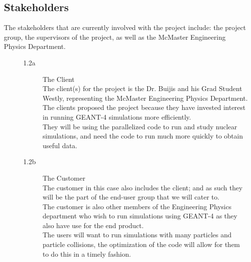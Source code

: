 \documentclass[12pt]{article}
\begin{document}
\subsection{Stakeholders} %
The stakeholders that are currently involved with the project include: the project group, the supervisors of the project, as well as the McMaster Engineering Physics Department.

\begin{description}
\item[]\indent
\begin{description}
 	\item[1.2a] The Client \\
	The client(s) for the project is the Dr. Buijis and his Grad Student Westly, representing the McMaster Engineering Physics Department.\\
	The clients proposed the project because they have invested interest in running GEANT-4 simulations more efficiently. \\
	They will be using the parallelized code to run and study nuclear simulations, and need the code to run much more quickly to 			obtain useful data. \\
	
  \item[1.2b]The Customer \\
	The customer in this case also includes the client; and as such they will be the part of the end-user group that we will cater to.\\
	The customer is also other members of the Engineering Physics department who wish to run simulations using GEANT-4 as they 		also have use for the end product. \\
	The users will want to run simulations with many particles and particle collisions, the optimization of the code will allow for 			them to do this in a timely fashion. \\	
	

\end{description}
\end{description}
\end{document}
